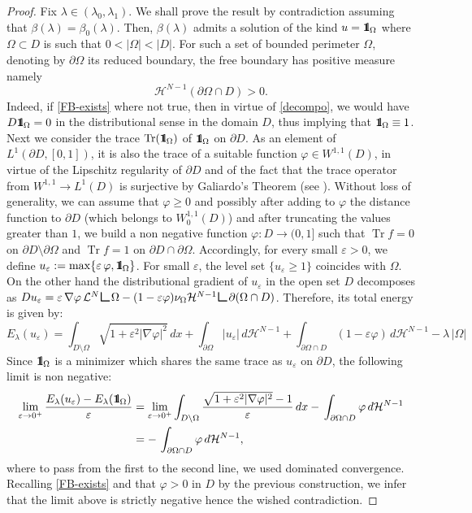 \documentclass[reqno,11pt]{amsart}
\theoremstyle{definition}
\numberwithin{equation}{section}
\def\e{\varepsilon}
\DeclareMathOperator{\trace}{Tr}
\newcommand{\LL}{\mathcal{L}}
\newcommand{\HH}{\mathcal{H}}
\newcommand{\1}{{{\bf 1}\kern-0,28em\rm l}}
\newcommand{\one}{{{\bf 1}\kern-0,28em\rm l}}
\newcommand{\f}{\varphi}
\def\res{\text{\huge$\llcorner$}}
\def\O{\Omega}
\def\l{\lambda}
\begin{document}
\begin{proof}
Fix $\lambda\in(\lambda_0,\lambda_1)$. We shall prove the result by contradiction
assuming  that $\beta(\lambda) = \beta_0(\lambda)$. Then, $\beta(\l)$ admits a solution of the kind $ u=\one_\Omega$  where $\Omega \subset D$ is such that $0 <|\Omega| < |D|$.  For such a set of bounded perimeter $\Omega$, denoting  by $\partial \O$ its reduced boundary, the free boundary has positive measure namely
\begin{equation}\label{FB-exists}
\HH^{N-1}(\partial \O \cap D) >0  .
\end{equation}
  Indeed, if \eqref{FB-exists} where not true, then in virtue of \eqref{decompo}, we would have $D \one_\O=0$  in the distributional sense in the domain $D$, thus implying that $\one_\O\equiv 1$. Next we consider the trace $\trace(\one_\O)$ of $\one_\O$ on $\partial D$. As an element of $L^1(\partial D,[0,1])$, it is also the trace of a suitable function $\f\in W^{1,1}(D)$, in virtue of the Lipschitz regularity of $\partial D$ and of the fact that the trace operator 
  from $W^{1,1} \to L^1(D)$ is surjective by Galiardo's Theorem  (see \cite[Theorem 9]{gagliardo}). Without loss of generality, we can assume that $\f\ge 0$
   and possibly after adding to $\f$ the distance function to $\partial D$ (which belongs to $W_0^{1,1}(D)$) and after truncating the values greater than $1$,
   we build a non negative function $\f: D \to (0,1]$ such that $\trace f = 0$ on $\partial D\setminus \partial \O$ and $\trace f = 1$ on $\partial D\cap\partial \O$.
  Accordingly, for every small $\e>0$, we define $u_\e:= \max\{ \e \, \f, \one_\O\}$. For small $\e$, the level set  $\{u_\e\ge 1\}$ coincides with $\O$. On the other hand  the  distributional gradient of $u_\e$ in the open set $D$ decomposes as
   $ Du_\e = \e \, \nabla\f \, \LL^N\res \O  - (1- \e \f) \nu_\O \HH^{N-1}\res \partial(\O\cap D)$. Therefore, its total energy  is given by:
  $$  E_\l(u_\e) = \int_{D\setminus\O} \sqrt{1+ \e^2 |\nabla \f|^2} \, dx + \int_{\partial\O} |u_\e| \, d\HH^{N-1} + \int_{\partial\O\cap D}
   (1- \e \f)\, d\HH^{N-1}  - \l \, |\O| $$
  Since $\one_\O$ is a minimizer which shares  the same trace as $u_\e$ on $\partial D$, the following limit is non negative:
  \begin{align*}
    \lim_{\e\to 0^+} \frac{ E_\l(u_\e)-E_\l(\one_\O)}{\e} &= \lim_{\e\to 0^+} \int_{D\setminus\O} \frac{\sqrt{1+ \e^2 |\nabla \f|^2}-1}{\e} \, dx 
 - \,  \int_{\partial\O\cap D} \f\,   d\HH^{N-1} \\
 &=  - \,  \int_{\partial\O\cap D} \f\,   d\HH^{N-1} ,
 \end{align*}
where to pass from the first to the second line, we used dominated convergence. 
Recalling \eqref{FB-exists} and that $\f>0$ in $D$ by the previous construction, we infer that the limit above is strictly negative hence  the wished contradiction.


\end{proof}
\end{document}

